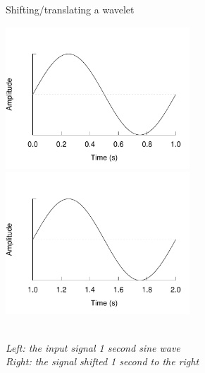 \begin{figure}[h]
\caption{Shifting/translating a wavelet}\label{figure:shifting}
\caption*{\\[1em]\footnotesize\emph{Left: the input signal 1 second sine wave\\
Right: the signal shifted 1 second to the right}\rm}
\centering
	\includegraphics[width=196pt]{images/sine_full.pdf}
	\hspace{1em}
	\includegraphics[width=196pt]{images/sine_shifted.pdf}
\end{figure}